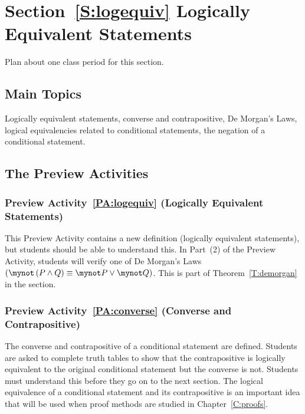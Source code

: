 \section*{Section~\ref{S:logequiv} Logically Equivalent Statements}
Plan about one class period for this section.

\subsection*{Main Topics}
Logically equivalent statements, converse and contrapositive, De Morgan's Laws, logical equivalencies related to conditional statements, the negation of a conditional statement.


\subsection*{The Preview Activities}
\subsubsection{Preview Activity~\ref{PA:logequiv} (Logically Equivalent Statements)}  This Preview Activity contains a new definition (logically equivalent statements), but students should be able to understand this.  In Part~(2) of the Preview Activity, students will verify one of De Morgan's Laws $\left( \mynot \left( P \wedge Q \right) \equiv \mynot P \vee \mynot Q \right)$.  This is part of Theorem~\ref{T:demorgan} in the section.  

\subsubsection*{Preview Activity~\ref{PA:converse} (Converse and Contrapositive)}
The converse and contrapositive of a conditional statement are defined.  Students are asked to complete truth tables to show that the contrapositive is logically equivalent to the original conditional statement but the converse is not.  Students must understand this before they go on to the next section.  The logical equivalence of a conditional statement and its contrapositive is an important idea that will be used when proof methods are studied in Chapter~\ref{C:proofs}.

\hbreak


